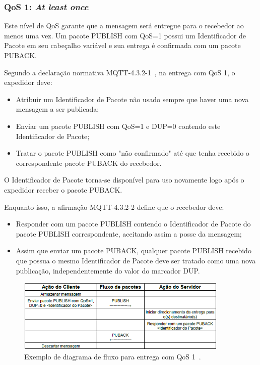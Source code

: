 \subsubsection*{QoS 1: \textit{At least once}}

Este nível de QoS garante que a mensagem será entregue para o recebedor ao menos uma vez. Um pacote PUBLISH com QoS=1 possui um Identificador de Pacote em seu cabeçalho variável e sua entrega é confirmada com um pacote PUBACK.

Segundo a declaração normativa MQTT-4.3.2-1~\cite{mqttv3.1.1}, na entrega com  QoS 1, o expedidor deve:
\begin{itemize}
	\item Atribuir um Identificador de Pacote não usado sempre que haver uma nova mensagem a ser publicada;
	\item Enviar um pacote PUBLISH com QoS=1 e DUP=0 contendo este Identificador de Pacote;
	\item Tratar o pacote PUBLISH como "não confirmado" até que tenha recebido o correspondente pacote PUBACK do recebedor. 
\end{itemize}

O Identificador de Pacote torna-se disponível para uso novamente logo após o expedidor receber o pacote PUBACK.

Enquanto isso, a afirmação MQTT-4.3.2-2 define que o recebedor deve:
\begin{itemize}
	\item Responder com um pacote PUBLISH contendo o Identificador de Pacote do pacote PUBLISH correspondente, aceitando assim a posse da mensagem;
	\item Assim que enviar um pacote PUBACK, qualquer pacote PUBLISH recebido que possua o mesmo Identificador de Pacote deve ser tratado como uma nova publicação, independentemente do valor do marcador DUP.
\end{itemize}

\begin{figure}[ht]
	\centering
	\includegraphics[width=0.9\textwidth]{imagens/mqtt_qos1.png}
	\caption{Exemplo de diagrama de fluxo para entrega com QoS 1~\cite{mqttv3.1.1}.
		\label{fig:mqtt_qos1}}
\end{figure}
\FloatBarrier

